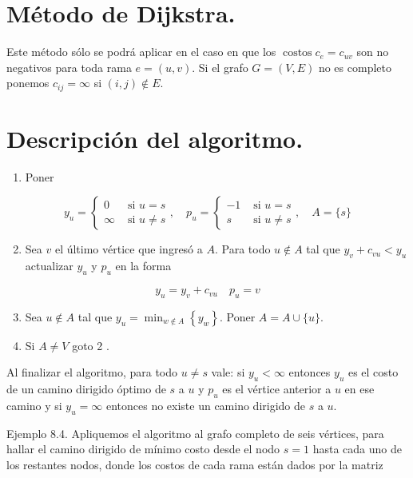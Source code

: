 \documentclass[10pt]{article}
\begin{document}
\section*{Método de Dijkstra.}
Este método sólo se podrá aplicar en el caso en que los $\operatorname{costos} c_{e}=c_{u v}$ son no negativos para toda rama $e=(u, v)$. Si el grafo $G=(V, E)$ no es completo ponemos $c_{i j}=\infty$ si $(i, j) \notin E$.

\section*{Descripción del algoritmo.}
\begin{enumerate}
  \item Poner
\end{enumerate}

$$
y_{u}=\left\{\begin{array}{ll}
0 & \text { si } u=s \\
\infty & \text { si } u \neq s
\end{array}, \quad p_{u}=\left\{\begin{array}{ll}
-1 & \text { si } u=s \\
s & \text { si } u \neq s
\end{array}, \quad A=\{s\}\right.\right.
$$

\begin{enumerate}
  \setcounter{enumi}{1}
  \item Sea $v$ el último vértice que ingresó a $A$. Para todo $u \notin A$ tal que $y_{v}+c_{v u}<y_{u}$ actualizar $y_{u}$ y $p_{u}$ en la forma
\end{enumerate}

$$
y_{u}=y_{v}+c_{v u} \quad p_{u}=v
$$

\begin{enumerate}
  \setcounter{enumi}{2}
  \item Sea $u \notin A$ tal que $y_{u}=\min _{w \notin A}\left\{y_{w}\right\}$. Poner $A=A \cup\{u\}$.
  \item Si $A \neq V$ goto 2 .
\end{enumerate}

Al finalizar el algoritmo, para todo $u \neq s$ vale: si $y_{u}<\infty$ entonces $y_{u}$ es el costo de un camino dirigido óptimo de $s$ a $u$ y $p_{u}$ es el vértice anterior a $u$ en ese camino y si $y_{u}=\infty$ entonces no existe un camino dirigido de $s$ a $u$.

Ejemplo 8.4. Apliquemos el algoritmo al grafo completo de seis vértices, para hallar el camino dirigido de mínimo costo desde el nodo $s=1$ hasta cada uno de los restantes nodos, donde los costos de cada rama están dados por la matriz
\end{document}
